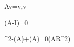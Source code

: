 A\mathbf v=\lambda\mathbf v,\qquad \mathbf v\ne{}

\det(A-\lambda I)=0

\lambda^2-(A)\lambda+\det(A)=0\quad(A\in\mathbb R^{2})
